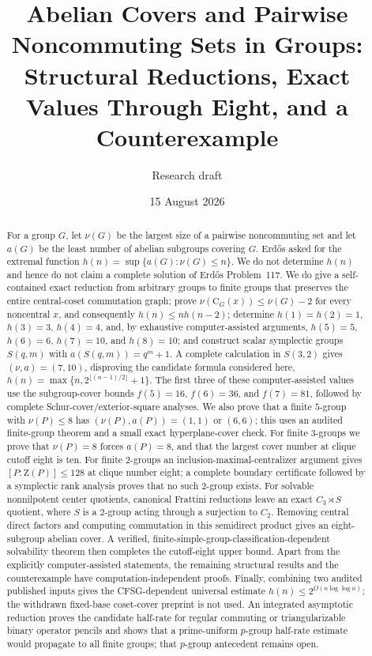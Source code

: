 \documentclass[11pt]{article}
\title{Abelian Covers and Pairwise Noncommuting Sets in Groups:\\
       Structural Reductions, Exact Values Through Eight, and a Counterexample}
\author{Research draft}
\date{15 August 2026}
\theoremstyle{remark}
\newcommand{\nuG}{\nu}
\newcommand{\aG}{a}
\newcommand{\Z}{\mathrm Z}
\newcommand{\CG}{\mathrm C}
\begin{document}
\maketitle

\begin{abstract}
For a group $G$, let $\nuG(G)$ be the largest size of a pairwise
noncommuting set and let $\aG(G)$ be the least number of abelian subgroups
covering $G$.  Erd\H{o}s asked for the extremal function
$h(n)=\sup\{\aG(G):\nuG(G)\le n\}$.  We do not determine $h(n)$ and hence
do not claim a complete solution of Erd\H{o}s Problem~117.  We do give a
self-contained exact reduction from arbitrary groups to finite groups that
preserves the entire central-coset commutation graph; prove
$\nuG(\CG_G(x))\le\nuG(G)-2$ for every noncentral $x$, and consequently
$h(n)\le n h(n-2)$; determine
$h(1)=h(2)=1$, $h(3)=3$, $h(4)=4$, and, by exhaustive
computer-assisted arguments, $h(5)=5$, $h(6)=6$, $h(7)=10$, and
$h(8)=10$; and
construct scalar symplectic groups $S(q,m)$ with
$\aG(S(q,m))=q^m+1$.  A complete calculation in $S(3,2)$ gives
$(\nuG,\aG)=(7,10)$, disproving the candidate formula considered here,
$h(n)=\max\{n,2^{\lfloor(n-1)/2\rfloor}+1\}$.  The first three of these
computer-assisted values use the subgroup-cover bounds $f(5)=16$,
$f(6)=36$, and $f(7)=81$, followed by complete
Schur-cover/exterior-square analyses. We also prove that a finite $5$-group
with $\nuG(P)\le8$ has $(\nuG(P),\aG(P))=(1,1)$ or $(6,6)$; this uses an audited
finite-group theorem and a small exact hyperplane-cover check.  For finite
$3$-groups we prove that $\nuG(P)=8$ forces $\aG(P)=8$, and that the largest
cover number at clique cutoff eight is ten.  For finite $2$-groups an
inclusion-maximal-centralizer argument gives $[P:\Z(P)]\le128$ at clique
number eight; a complete boundary certificate followed by a symplectic
rank analysis proves that no such $2$-group exists.  For solvable
nonnilpotent center quotients, canonical Frattini reductions leave an exact
$C_3\rtimes S$ quotient, where $S$ is a $2$-group acting through a
surjection to $C_2$.  Removing central direct factors and computing
commutation in this semidirect product gives an eight-subgroup abelian cover.
A verified, finite-simple-group-classification-dependent solvability theorem
then completes the cutoff-eight upper bound.  Apart from
the explicitly computer-assisted statements, the remaining structural results
and the counterexample have computation-independent proofs. Finally,
combining two audited published inputs gives the CFSG-dependent universal estimate
$h(n)\le2^{O(n\log\log n)}$; the withdrawn fixed-base coset-cover preprint
is not used.  An integrated asymptotic reduction proves the candidate
half-rate for regular commuting or triangularizable binary operator pencils
and shows that a prime-uniform $p$-group half-rate estimate would propagate
to all finite groups; that $p$-group antecedent remains open.
\end{abstract}
\end{document}
